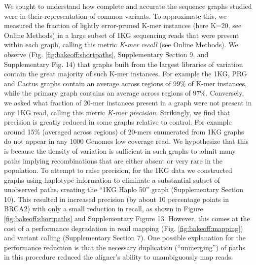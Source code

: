 We sought to understand how complete and accurate the sequence graphs
studied were in their representation of common variants. To approximate
this, we measured the fraction of lightly error-pruned K-mer instances
(here K=20, see Online Methods) in a large subset of 1KG sequencing
reads that were present within each graph, calling this metric
\emph{K-mer recall} (see Online Methods). We observe (Fig. \ref{fig:bakeoff:shortpaths},
Supplementary Section 9, and Supplementary Fig. 14) that graphs built
from the largest libraries of variation contain the great majority of
such K-mer instances. For example the 1KG, PRG and Cactus graphs contain
an average across regions of 99\% of K-mer instances, while the primary
graph contains an average across regions of 97\%. Conversely, we asked
what fraction of 20-mer instances present in a graph were not present in
any 1KG read, calling this metric \emph{K-mer precision}. Strikingly, we
find that precision is greatly reduced in some graphs relative to
control. For example around 15\% (averaged across regions) of 20-mers
enumerated from 1KG graphs do not appear in any 1000 Genomes low
coverage read. We hypothesize that this is because the density of
variation is sufficient in such graphs to admit many paths implying
recombinations that are either absent or very rare in the population. To
attempt to raise precision, for the 1KG data we constructed graphs using
haplotype information to eliminate a substantial subset of unobserved
paths, creating the ``1KG Haplo 50'' graph (Supplementary Section 10).
This resulted in increased precision (by about 10 percentage points in
BRCA2) with only a small reduction in recall, as shown in Figure \ref{fig:bakeoff:shortpaths} and
Supplementary Figure 13. However, this comes at the cost of a
performance degradation in read mapping (Fig. \ref{fig:bakeoff:mapping}) and variant calling
(Supplementary Section 7). One possible explanation for the performance
reduction is that the necessary duplication (``unmerging'') of paths in
this procedure reduced the aligner's ability to unambiguously map reads.

